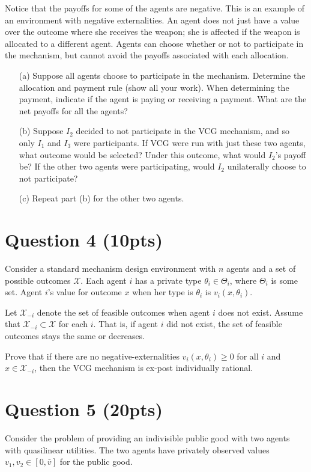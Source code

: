 \documentclass[10pt,a4paper]{article}
\begin{document}
  Notice that the payoffs for some of the agents are negative. This is an example of an environment with negative externalities. An agent does not just have a value over the outcome where she receives the weapon; she is affected if the weapon is allocated to a different agent. Agents can choose whether or not to participate in the mechanism, but cannot avoid the payoffs associated with each allocation.

  \begin{enumerate}
      \item[(a)] Suppose all agents choose to participate in the mechanism. Determine the allocation and payment rule (show all your work). When determining the payment, indicate if the agent is paying or receiving a payment. What are the net payoffs for all the agents?
      \item[(b)] Suppose $I_2$ decided to not participate in the VCG mechanism, and so only $I_1$ and $I_3$ were participants. If VCG were run with just these two agents, what outcome would be selected? Under this outcome, what would $I_2$'s payoff be? If the other two agents were participating, would $I_2$ unilaterally choose to not participate?
      \item[(c)] Repeat part (b) for the other two agents.
  \end{enumerate}

\section*{Question 4 (10pts)}
  Consider a standard mechanism design environment with $n$ agents and a set of possible outcomes $\mathcal{X}$. Each agent $i$ has a private type $\theta_i \in \Theta_i$, where $\Theta_i$ is some set. Agent $i$'s value for outcome $x$ when her type is $\theta_i$ is $v_i(x, \theta_i)$.

  Let $\mathcal{X}_{-i}$ denote the set of feasible outcomes when agent $i$ does not exist. Assume that $\mathcal{X}_{-i} \subset \mathcal{X}$ for each $i$. That is, if agent $i$ did not exist, the set of feasible outcomes stays the same or decreases.

  Prove that if there are no negative-externalities $v_i(x, \theta_i) \geq 0$ for all $i$ and $x \in \mathcal{X}_{-i}$, then the VCG mechanism is ex-post individually rational.

\section*{Question 5 (20pts)}
  Consider the problem of providing an indivisible public good with two agents with quasilinear utilities. The two agents have privately observed values $v_1, v_2 \in [0, \bar{v}]$ for the public good.
\end{document}
